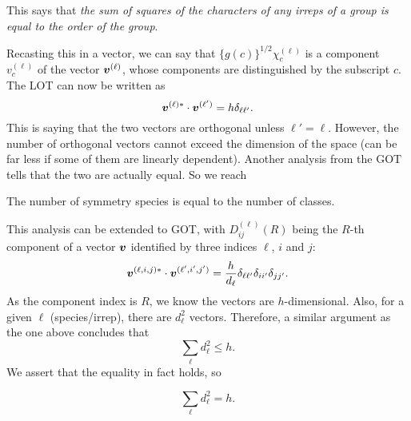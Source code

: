 This says that \textit{the sum of squares of the characters of any irreps of a group is equal to the order of the group}. \par
Recasting this in a vector, we can say that $\{g(c)\}^{1/2}\chi_c^{(\ell)}$ is 
a component $v_c^{(\ell)}$ of the vector $\boldsymbol{v}^{(\ell)}$, whose components are 
distinguished by the subscript $c$. The LOT can now be written as
\begin{equation}
\boldsymbol{v}^{(\ell)*}\cdot\boldsymbol{v}^{(\ell')}=h\delta_{\ell\ell'}.
\end{equation}
This is saying that the two vectors are orthogonal unless $\ell'=\ell$. 
However, the number of orthogonal vectors cannot exceed the dimension of the 
space (can be far less if some of them are linearly dependent). Another analysis 
from the GOT tells that the two are actually equal. So we reach 
\begin{thrm}[Restriction 1]
The number of symmetry species is equal to the number of classes.
\end{thrm}
This analysis can be extended to GOT, with $D_{ij}^{(\ell)}(R)$ being the $R$-th 
component of a vector $\boldsymbol{v}$ identified by three indices $\ell$, $i$ and $j$: 
\begin{equation}
\boldsymbol{v}^{(\ell,i,j)*}\cdot\boldsymbol{v}^{(\ell',i',j')}=\frac{h}{d_{\ell}}\delta_{\ell\ell'}\delta_{ii'}\delta_{jj'}.
\end{equation}
As the component index is $R$, we know the vectors are $h$-dimensional. Also, for 
a given $\ell$ (species/irrep), there are $d_{\ell}^2$ vectors. Therefore, 
a similar argument as the one above concludes that 
\begin{equation}
\sum_{\ell}d_{\ell}^2\leq h.
\end{equation}
We assert that the equality in fact holds, so
\begin{thrm}[Restriction 2]
\begin{equation}
\sum_{\ell}d_{\ell}^2=h.
\end{equation}
\end{thrm}

